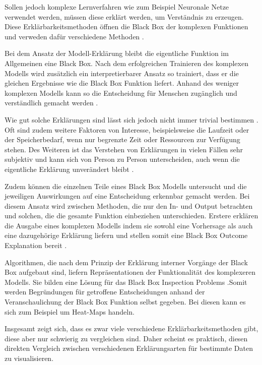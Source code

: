 Sollen jedoch komplexe Lernverfahren wie zum Beispiel Neuronale Netze verwendet werden, müssen diese erklärt werden, um Verständnis zu erzeugen. Diese Erklärbarkeitsmethoden öffnen die Black Box der komplexen Funktionen und verweden dafür verschiedene Methoden \cite{GuidottiErklaerbarkeit}. 


Bei dem Ansatz der Modell-Erklärung bleibt die eigentliche Funktion im Allgemeinen eine Black Box. Nach dem erfolgreichen Trainieren des komplexen Modells wird zusätzlich ein interpretierbarer Ansatz so trainiert, dass er die gleichen Ergebnisse wie die Black Box Funktion liefert. Anhand des weniger komplexen Modells kann so die Entscheidung für Menschen zugänglich und verständlich gemacht werden \cite{GuidottiErklaerbarkeit}.


Wie gut solche Erklärungen sind lässt sich jedoch nicht immer trivial bestimmen \cite{RudinStopExplaining}. Oft sind zudem weitere Faktoren von Interesse, beispielsweise die Laufzeit oder der Speicherbedarf, wenn nur begrenzte Zeit oder Ressourcen zur Verfügung stehen. Des Weiteren ist das Verstehen von Erklärungen in vielen Fällen sehr subjektiv und kann sich von Person zu Person unterscheiden, auch wenn die eigentliche Erklärung unverändert bleibt \cite{MoellerKonstruktivismus}.


Zudem können die einzelnen Teile eines Black Box Modells untersucht und die jeweiligen Auswirkungen auf eine Entscheidung erkennbar gemacht werden. Bei diesem Ansatz wird zwischen Methoden, die nur den In- und Output betrachten und solchen, die die gesamte Funktion einbeziehen unterschieden. Erstere erklären die Ausgabe eines komplexen Modells indem sie sowohl eine Vorhersage als auch eine dazugehörige Erklärung liefern und stellen somit eine Black Box Outcome Explanation bereit \cite{GuidottiErklaerbarkeit}.  

Algorithmen, die nach dem Prinzip der Erklärung interner Vorgänge der Black Box aufgebaut sind, liefern Repräsentationen der Funktionalität des komplexeren Modells. Sie bilden eine Lösung für das Black Box Inspection Problems \cite{GuidottiErklaerbarkeit}.Somit werden Begründungen für getroffene Entscheidungen anhand der Veranschaulichung der Black Box Funktion selbst gegeben.  Bei diesen kann es sich zum Beispiel um Heat-Maps  handeln.


Insgesamt zeigt sich, dass es zwar viele verschiedene Erklärbarkeitsmethoden gibt, diese aber nur schwierig zu vergleichen sind. Daher scheint es praktisch, diesen direkten Vergleich zwischen verschiedenen Erklärungsarten für bestimmte Daten zu visualisieren.


